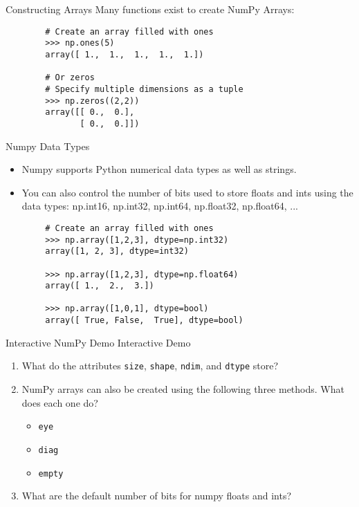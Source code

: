 \documentclass[serif,xcolor=pdftex,dvipsnames,table,hyperref={bookmarks=false,breaklinks}]{beamer}
\begin{document}
\begin{frame}[t,fragile]{Constructing Arrays}
	Many functions exist to create NumPy Arrays:
	
 	\begin{lstlisting}
		# Create an array filled with ones
		>>> np.ones(5)
		array([ 1.,  1.,  1.,  1.,  1.])
		
		# Or zeros
		# Specify multiple dimensions as a tuple
		>>> np.zeros((2,2))
		array([[ 0.,  0.],
		       [ 0.,  0.]])
	\end{lstlisting}
\end{frame}

\begin{frame}[t,fragile]{Numpy Data Types}
	\begin{itemize}[<+->]
		\item Numpy supports Python numerical data types as well as strings.
		\item You can also control the number of bits used to store floats and ints using the data types: np.int16, np.int32, np.int64, np.float32, np.float64, ...
	\end{itemize}
	
	\pause
	\begin{lstlisting}
		# Create an array filled with ones
		>>> np.array([1,2,3], dtype=np.int32)
		array([1, 2, 3], dtype=int32)

		>>> np.array([1,2,3], dtype=np.float64)
		array([ 1.,  2.,  3.])

		>>> np.array([1,0,1], dtype=bool)
		array([ True, False,  True], dtype=bool)
	\end{lstlisting}
	
\end{frame}

\begin{frame}[t,fragile]{Interactive NumPy Demo}
	\centering
	\Huge{Interactive Demo}
	\normalsize
	\begin{enumerate}
		\item What do the attributes \verb|size|, \verb|shape|, \verb|ndim|, and \verb|dtype| store?
		\item NumPy arrays can also be created using the following three methods. What does each one do?
		\begin{itemize}
			\item \verb|eye|
			\item \verb|diag|
			\item \verb|empty|
		\end{itemize}
		\item What are the default number of bits for numpy floats and ints?
	\end{enumerate}
\end{frame}
\end{document}
